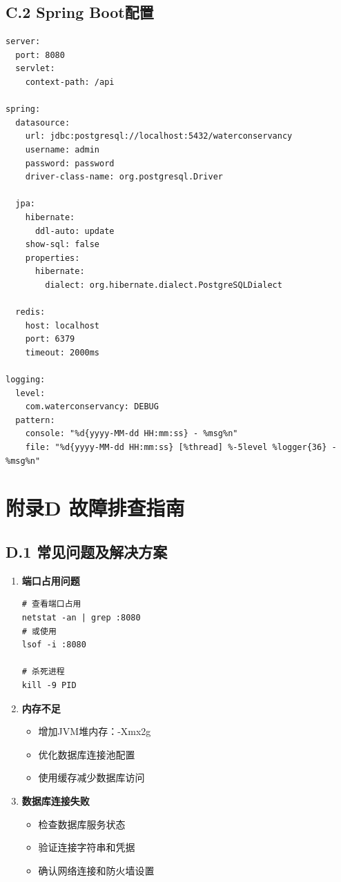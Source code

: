 \subsection*{C.2 Spring Boot配置}

\begin{lstlisting}[style=yaml]
server:
  port: 8080
  servlet:
    context-path: /api

spring:
  datasource:
    url: jdbc:postgresql://localhost:5432/waterconservancy
    username: admin
    password: password
    driver-class-name: org.postgresql.Driver
  
  jpa:
    hibernate:
      ddl-auto: update
    show-sql: false
    properties:
      hibernate:
        dialect: org.hibernate.dialect.PostgreSQLDialect

  redis:
    host: localhost
    port: 6379
    timeout: 2000ms

logging:
  level:
    com.waterconservancy: DEBUG
  pattern:
    console: "%d{yyyy-MM-dd HH:mm:ss} - %msg%n"
    file: "%d{yyyy-MM-dd HH:mm:ss} [%thread] %-5level %logger{36} - %msg%n"
\end{lstlisting}

\section*{附录D 故障排查指南}

\subsection*{D.1 常见问题及解决方案}

\begin{enumerate}
\item \textbf{端口占用问题}
   \begin{lstlisting}[style=bash]
# 查看端口占用
netstat -an | grep :8080
# 或使用
lsof -i :8080

# 杀死进程
kill -9 PID
   \end{lstlisting}

\item \textbf{内存不足}
   \begin{itemize}
   \item 增加JVM堆内存：-Xmx2g
   \item 优化数据库连接池配置
   \item 使用缓存减少数据库访问
   \end{itemize}

\item \textbf{数据库连接失败}
   \begin{itemize}
   \item 检查数据库服务状态
   \item 验证连接字符串和凭据
   \item 确认网络连接和防火墙设置
   \end{itemize}
\end{enumerate}

